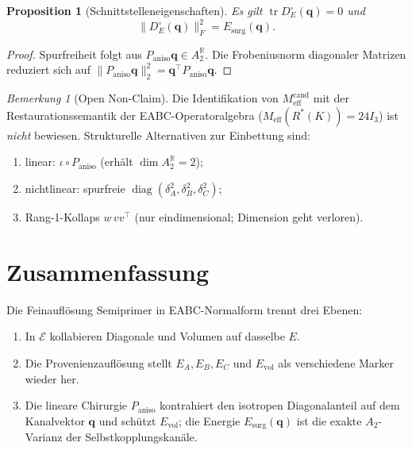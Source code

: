\documentclass[11pt,a4paper]{article}
\newtheorem{proposition}[theorem]{Proposition}
\theoremstyle{definition}
\theoremstyle{remark}
\newtheorem{remark}[theorem]{Bemerkung}
\newcommand{\E}{\mathcal{E}}
\newcommand{\R}{\mathbb{R}}
\newcommand{\qq}{\mathbf{q}}
\newcommand{\Pan}{P_{\mathrm{aniso}}}
\newcommand{\Evol}{E_{\mathrm{vol}}}
\newcommand{\Esurg}{E_{\mathrm{surg}}}
\begin{document}
	\begin{proposition}[Schnittstelleneigenschaften]
		\label{prop:interface}
		Es gilt $\operatorname{tr}D_E^\circ(\qq)=0$ und
		\[
		\bigl\|D_E^\circ(\qq)\bigr\|_F^2
		=
		\Esurg(\qq).
		\]
	\end{proposition}
	
	\begin{proof}
		Spurfreiheit folgt aus $\Pan\qq\in A_2^\R$.
		Die Frobeniusnorm diagonaler Matrizen reduziert sich auf
		$\|\Pan\qq\|_2^2=\qq^\top\Pan\qq$.
	\end{proof}
	
	\begin{remark}[Open Non-Claim]
		\label{rem:open}
		Die Identifikation von $M_{\mathrm{eff}}^{\mathrm{cand}}$ mit der
		Restaurationssemantik der EABC-Operatoralgebra
		($M_{\mathrm{eff}}(R^*(K))=24I_3$) ist \emph{nicht} bewiesen.
		Strukturelle Alternativen zur Einbettung sind:
		\begin{enumerate}
			\item linear: $\iota\circ\Pan$ (erhält $\dim A_2^\R=2$);
			\item nichtlinear: spurfreie $\operatorname{diag}(\delta_A^2,\delta_B^2,\delta_C^2)$;
			\item Rang-1-Kollaps $w\,vv^\top$ (nur eindimensional; Dimension geht verloren).
		\end{enumerate}
	\end{remark}
	
	\section{Zusammenfassung}
	\label{sec:summary}
	
	Die Feinauflösung Semiprimer in EABC-Normalform trennt drei Ebenen:
	
	\begin{enumerate}
		\item In $\E$ kollabieren Diagonale und Volumen auf dasselbe $E$.
		\item Die Provenienzauflösung stellt $E_A,E_B,E_C$ und $\Evol$ als
		verschiedene Marker wieder her.
		\item Die lineare Chirurgie $\Pan$ kontrahiert den isotropen Diagonalanteil
		auf dem Kanalvektor $\qq$ und schützt $\Evol$; die Energie
		$\Esurg(\qq)$ ist die exakte $A_2$-Varianz der Selbstkopplungskanäle.
	\end{enumerate}
	
\end{document}
